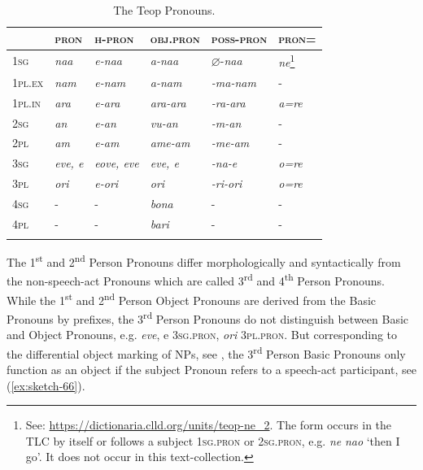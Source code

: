 \documentclass[output=paper]{langscibook}
\begin{document}
\begin{table}[b]
    \caption{The Teop Pronouns.} \label{tab:pronouns}
\begin{tabularx}{\textwidth}{XXXXXl}
    \lsptoprule
    &\textsc{pron}&\textsc{h-pron}&\textsc{obj.pron}&\textsc{poss-pron}&\textsc{pron=}\\
    \midrule
    1\textsc{sg}&\textit{naa}&\textit{e-naa}&\textit{a-naa}&$\varnothing$-\textit{naa}&\textit{ne}\footnote{See: \url{https://dictionaria.clld.org/units/teop-ne\_2}. The form occurs in the TLC by itself or follows a subject 1\textsc{sg}.\textsc{pron} or 2\textsc{sg}.\textsc{pron}, e.g. \textit{ne} \textit{nao} `then I go'. It does not occur in this text-collection.}\\
    1\textsc{pl}.\textsc{ex}&\textit{nam}&\textit{e-nam}&\textit{a-nam}&\textit{-ma-nam}&-\\
    1\textsc{pl}.\textsc{in}&\textit{ara}&\textit{e-ara}&\textit{ara-ara}&\textit{-ra-ara}&\textit{a=re}\\
    2\textsc{sg}&\textit{an}&\textit{e-an}&\textit{vu-an}&\textit{-m-an}&-\\
    2\textsc{pl}&\textit{am}&\textit{e-am}&\textit{ame-am}&\textit{-me-am}&-\\
    3\textsc{sg}&\textit{eve, e}&\textit{eove, eve}&\textit{eve, e}&\textit{-na-e}&\textit{o=re}\\
    3\textsc{pl}&\textit{ori}&\textit{e-ori}&\textit{ori}&\textit{-ri-ori}&\textit{o=re}\\
    4\textsc{sg}&-&-&\textit{bona}&-&-\\
    4\textsc{pl}&-&-&\textit{bari}&-&-\\
    \lspbottomrule
\end{tabularx}
\end{table}


The 1\textsuperscript{st} and 2\textsuperscript{nd} Person Pronouns differ morphologically and syntactically from the non-speech-act Pronouns which are called 3\textsuperscript{rd} and 4\textsuperscript{th} Person Pronouns. While the 1\textsuperscript{st} and 2\textsuperscript{nd} Person Object Pronouns are derived from the Basic Pronouns by prefixes, the 3\textsuperscript{rd} Person Pronouns do not distinguish between Basic and Object Pronouns, e.g. \textit{eve}, e 3\textsc{sg}.\textsc{pron}, \textit{ori} 3\textsc{pl}.\textsc{pron}. But corresponding to the differential object marking of NPs, see , the 3\textsuperscript{rd} Person Basic Pronouns only function as an object if the subject Pronoun refers to a speech-act participant, see (\ref{ex:sketch-66}).
\end{document}
